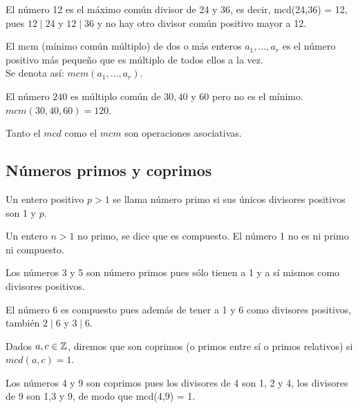 \begin{ejemplo}
El número 12 es el máximo común divisor de 24 y 36, es decir, mcd(24,36) = 12, pues $12 \mid 24$ \; y \; $12 \mid 36$ y no hay otro divisor común positivo mayor a 12.
\end{ejemplo}

\begin{definicion}[mcm]\label{def:mcd}
El mcm (mínimo común múltiplo) de dos o más enteros $a_1, \ldots, a_r$ es el número positivo más pequeño que es múltiplo de todos ellos a la vez.  \\
Se denota así: $mcm(a_1, \ldots, a_r)$.
\end{definicion}

\begin{ejemplo}
El número $240$ es múltiplo común de $30, 40$ y $60$ pero no es el mínimo. \\
$mcm(30,40,60)=120$.
\end{ejemplo}

Tanto el $mcd$ como el $mcm$ son operaciones asociativas.

\subsection{Números primos y coprimos}

\begin{definicion}\label{def:numPrimo}
Un entero positivo $p > 1$ se llama número primo si sus únicos divisores positivos son 1 y $p$.
\end{definicion}

Un entero $n > 1$ no primo, se dice que es compuesto. 
El número 1 no es ni primo ni compuesto.

\begin{ejemplo}
Los números 3 y 5 son número primos pues sólo tienen a 1 y a sí mismos como divisores positivos.
\end{ejemplo}

\begin{ejemplo}
El número 6 es compuesto pues además de tener a 1 y 6 como divisores positivos, también $2 \mid 6$ \; y \; $3 \mid 6$.
\end{ejemplo}

\begin{definicion} \label{def:numCoprimo}
Dados $a,c \in \mathbb{Z}$, diremos que son coprimos (o primos entre sí o primos relativos) si $mcd(a,c) = 1$.
\end{definicion}

\begin{ejemplo}
Los números 4 y 9 son coprimos pues los divisores de 4 son 1, 2 y 4, los divisores de 9 son 1,3 y 9, de modo que mcd(4,9) = 1.
\end{ejemplo}

